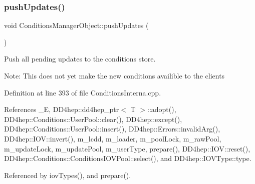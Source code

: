 \hypertarget{class_d_d4hep_1_1_conditions_1_1_conditions_manager_object_a9bda89e54e1ad3b202f7295ec6c102a8}{}\label{class_d_d4hep_1_1_conditions_1_1_conditions_manager_object_a9bda89e54e1ad3b202f7295ec6c102a8} 
\subsubsection{\texorpdfstring{push\+Updates()}{pushUpdates()}}
{\footnotesize\ttfamily void Conditions\+Manager\+Object\+::push\+Updates (\begin{DoxyParamCaption}{ }\end{DoxyParamCaption})}



Push all pending updates to the conditions store. 

Note\+: This does not yet make the new conditions availible to the clients 

Definition at line 393 of file Conditions\+Interna.\+cpp.



References \+\_\+E, D\+D4hep\+::dd4hep\+\_\+ptr$<$ T $>$\+::adopt(), D\+D4hep\+::\+Conditions\+::\+User\+Pool\+::clear(), D\+D4hep\+::except(), D\+D4hep\+::\+Conditions\+::\+User\+Pool\+::insert(), D\+D4hep\+::\+Errors\+::invalid\+Arg(), D\+D4hep\+::\+I\+O\+V\+::invert(), m\+\_\+lcdd, m\+\_\+loader, m\+\_\+pool\+Lock, m\+\_\+raw\+Pool, m\+\_\+update\+Lock, m\+\_\+update\+Pool, m\+\_\+user\+Type, prepare(), D\+D4hep\+::\+I\+O\+V\+::reset(), D\+D4hep\+::\+Conditions\+::\+Conditions\+I\+O\+V\+Pool\+::select(), and D\+D4hep\+::\+I\+O\+V\+Type\+::type.



Referenced by iov\+Types(), and prepare().

\hypertarget{class_d_d4hep_1_1_conditions_1_1_conditions_manager_object_ac945da1c9e23ba4e7db40221a38d4abc}{}\label{class_d_d4hep_1_1_conditions_1_1_conditions_manager_object_ac945da1c9e23ba4e7db40221a38d4abc} 
